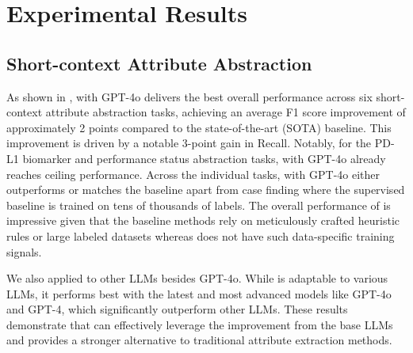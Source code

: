 \section{Experimental Results}
\subsection{Short-context Attribute Abstraction}


As shown in , \ours with GPT-4o delivers the best overall performance across six short-context attribute abstraction tasks, achieving an average F1 score improvement of approximately 2 points compared to the state-of-the-art (SOTA) baseline. This improvement is driven by a notable 3-point gain in Recall. Notably, for the PD-L1 biomarker and performance status abstraction tasks, \ours with GPT-4o already reaches ceiling performance. 
Across the individual tasks, \ours with GPT-4o either outperforms or matches the baseline apart from case finding where the supervised baseline is trained on tens of thousands of labels. 
The overall performance of \ours is impressive given that the baseline methods rely on meticulously crafted heuristic rules or large labeled datasets whereas \ours does not have such data-specific training signals.

We also applied \ours to other \acp{LLM} besides GPT-4o. While \ours is adaptable to various \acp{LLM}, it performs best with the latest and most advanced models like GPT-4o and GPT-4, which significantly outperform other \acp{LLM}. These results demonstrate that \ours can effectively leverage the improvement from the base \acp{LLM} and \ours provides a stronger alternative to traditional attribute extraction methods.

